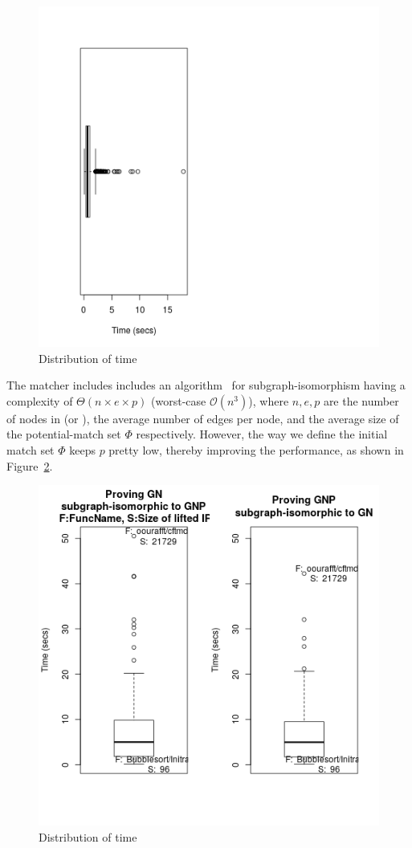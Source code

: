 \begin{figure}
    \includegraphics[scale=0.5]{scalable-validation/figs/compdtime.png}
    \caption{Distribution of  \compd time} \label{fig:compdtime}
\end{figure}

The matcher includes includes an algorithm~\cite{Saltz2014} for subgraph-isomorphism
having a complexity of $\Theta(n \times e \times p)$ (worst-case $\mathcal{O}(n^3)$), where $n, e, p$ are
the number of nodes in \GN (or \GNP), the average number of edges per node, and the average
size of the potential-match set $\Phi$ respectively. However, the way we define the initial match set $\Phi$
keeps $p$ pretty low, thereby improving the performance, as shown in Figure~\ref{fig:matchtime}. 
\begin{figure}
    \includegraphics[scale=0.5]{scalable-validation/figs/matchtime.png}
    \caption{Distribution of  \matcher time} \label{fig:matchtime}
\end{figure}


